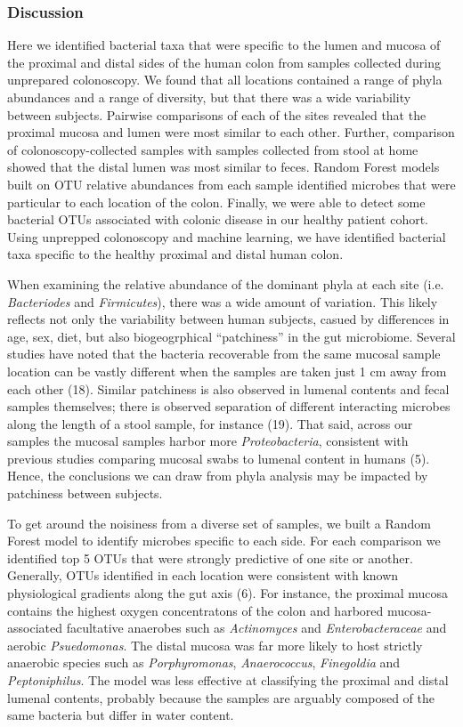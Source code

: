 \documentclass[11pt,]{article}
\begin{document}
\subsubsection{Discussion}\label{discussion}

Here we identified bacterial taxa that were specific to the lumen and
mucosa of the proximal and distal sides of the human colon from samples
collected during unprepared colonoscopy. We found that all locations
contained a range of phyla abundances and a range of diversity, but that
there was a wide variability between subjects. Pairwise comparisons of
each of the sites revealed that the proximal mucosa and lumen were most
similar to each other. Further, comparison of colonoscopy-collected
samples with samples collected from stool at home showed that the distal
lumen was most similar to feces. Random Forest models built on OTU
relative abundances from each sample identified microbes that were
particular to each location of the colon. Finally, we were able to
detect some bacterial OTUs associated with colonic disease in our
healthy patient cohort. Using unprepped colonoscopy and machine
learning, we have identified bacterial taxa specific to the healthy
proximal and distal human colon.

When examining the relative abundance of the dominant phyla at each site
(i.e. \emph{Bacteriodes} and \emph{Firmicutes}), there was a wide amount
of variation. This likely reflects not only the variability between
human subjects, casued by differences in age, sex, diet, but also
biogeogrphical ``patchiness'' in the gut microbiome. Several studies
have noted that the bacteria recoverable from the same mucosal sample
location can be vastly different when the samples are taken just 1 cm
away from each other (18). Similar patchiness is also observed in
lumenal contents and fecal samples themselves; there is observed
separation of different interacting microbes along the length of a stool
sample, for instance (19). That said, across our samples the mucosal
samples harbor more \emph{Proteobacteria}, consistent with previous
studies comparing mucosal swabs to lumenal content in humans (5). Hence,
the conclusions we can draw from phyla analysis may be impacted by
patchiness between subjects.

To get around the noisiness from a diverse set of samples, we built a
Random Forest model to identify microbes specific to each side. For each
comparison we identified top 5 OTUs that were strongly predictive of one
site or another. Generally, OTUs identified in each location were
consistent with known physiological gradients along the gut axis (6).
For instance, the proximal mucosa contains the highest oxygen
concentratons of the colon and harbored mucosa-associated facultative
anaerobes such as \emph{Actinomyces} and \emph{Enterobacteraceae} and
aerobic \emph{Psuedomonas}. The distal mucosa was far more likely to
host strictly anaerobic species such as \emph{Porphyromonas},
\emph{Anaerococcus}, \emph{Finegoldia} and \emph{Peptoniphilus}. The
model was less effective at classifying the proximal and distal lumenal
contents, probably because the samples are arguably composed of the same
bacteria but differ in water content.
\end{document}
